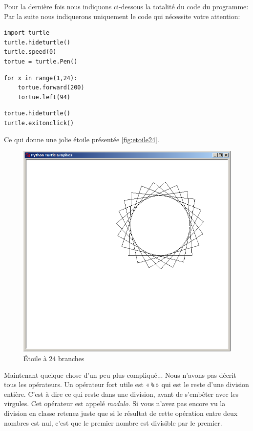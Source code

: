 Pour la dernière fois nous indiquons ci-dessous la totalité du code du programme: Par la suite nous indiquerons uniquement le code qui nécessite votre attention:
\begin{Verbatim}[frame=single,rulecolor=\color{mbleu}, label=ne sera plus rappelé]
import turtle
turtle.hideturtle()
turtle.speed(0)
tortue = turtle.Pen()
\end{Verbatim}
\begin{Verbatim}[frame=single,rulecolor=\color{mbleu}, label= à taper]
for x in range(1,24):
	tortue.forward(200)
	tortue.left(94)
\end{Verbatim}
\begin{Verbatim}[frame=single,rulecolor=\color{mbleu}, label=ne sera plus rappelé]
tortue.hideturtle()
turtle.exitonclick()
\end{Verbatim}
 
Ce qui donne une jolie étoile présentée \autoref{fig:etoile24}.
\begin{figure}[H]
\centering
\includegraphics[scale=0.4]{images/etoile24}
\caption{Étoile à 24 branches}\label{fig:etoile24}
\end{figure}

Maintenant quelque chose d'un peu plus compliqué... Nous n'avons pas décrit tous les opérateurs. Un opérateur fort utile est « \texttt{\%} » qui est le reste d'une division entière. C'est à dire ce qui reste dans une division, avant de s'embêter avec les virgules. Cet opérateur est appelé \emph{modulo}. Si vous n'avez pas encore vu la division en classe retenez juste que si le résultat de cette opération entre deux nombres est nul, c'est que le premier nombre est divisible par le premier.

